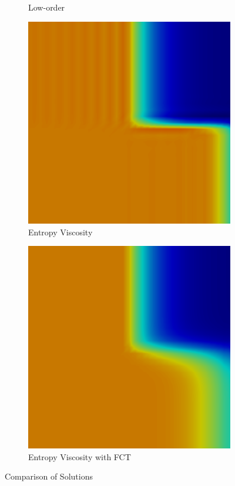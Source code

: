 \begin{figure}[h]
\begin{subfigure}{0.3\textwidth}
      \caption{Low-order}
   \end{subfigure}
   \begin{subfigure}{0.3\textwidth}
      \includegraphics[width=\textwidth]{void_to_absorber/EV.png}
      \caption{Entropy Viscosity}
   \end{subfigure}
   \begin{subfigure}{0.3\textwidth}
      \includegraphics[width=\textwidth]{void_to_absorber/EVFCT.png}
      \caption{Entropy Viscosity with FCT}
   \end{subfigure}
   \caption{Comparison of Solutions}
\end{figure}

